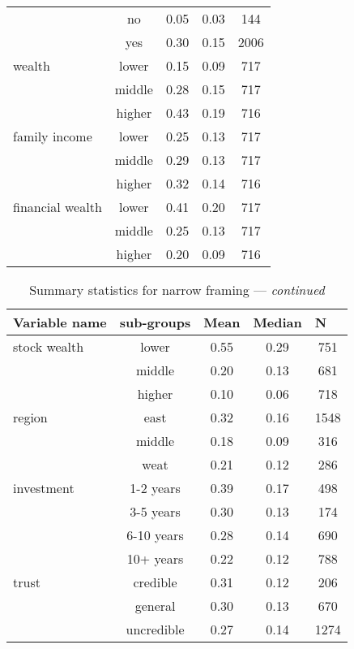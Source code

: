 \documentclass[ukenglish,nottitlepage,thmsb,11pt,letterpaper]{article}
\begin{document}
\begin{spacing}{1}
\begin{table}[H]
\begin{tabular*}{\textwidth}{l @{\extracolsep{\fill}} cccc}
		&no          &0.05	&0.03	&144   \\
		&yes         &0.30	&0.15	&2006  \\
		\midrule         
		wealth	
		&lower     &0.15	&0.09	&717 \\
		&middle    &0.28	&0.15	&717 \\
		&higher    &0.43	&0.19	&716 \\
		\midrule
		family income
		&lower     &0.25	&0.13	&717 \\
		&middle    &0.29	&0.13	&717 \\
		&higher    &0.32	&0.14	&716 \\
		\midrule
		financial wealth 
		&lower     &0.41	&0.20	&717 \\
		&middle    &0.25	&0.13	&717 \\
		&higher    &0.20	&0.09	&716 \\
	     \bottomrule
     \end{tabular*}%
 \end{table}%
\setcounter{table}{3} %
\begin{table}[H]
		\renewcommand\arraystretch{1.5}%
		\centering
		\caption{Summary statistics for narrow framing --- \textit{continued}}
		\small
		\begin{tabular*}{\textwidth}{l @{\extracolsep{\fill}} cccc}
		\toprule
		Variable name  &sub-groups  & \multicolumn{1}{l}{Mean}  & \multicolumn{1}{l}{Median} & \multicolumn{1}{l}{N} \\
		\midrule
		stock wealth
		&lower  &0.55	&0.29	&751 \\
		&middle &0.20	&0.13	&681 \\
		&higher &0.10	&0.06	&718 \\
		\midrule
		region	
		&east  		&0.32	&0.16	&1548 \\
		&middle      &0.18	&0.09	&316          \\
		&weat        &0.21	&0.12	&286          \\
		\midrule
		investment 
		&1-2 years   &0.39	&0.17	&498 \\
		&3-5 years   &0.30	&0.13	&174 \\
		&6-10 years  &0.28	&0.14	&690 \\
		&10+ years   &0.22	&0.12	&788 \\
		\midrule
		trust	
		&credible   &0.31	&0.12	&206  \\
		&general    &0.30	&0.13	&670  \\
		&uncredible &0.27	&0.14	&1274 \\

\end{tabular*}
\end{table}
\end{spacing}
\end{document}
